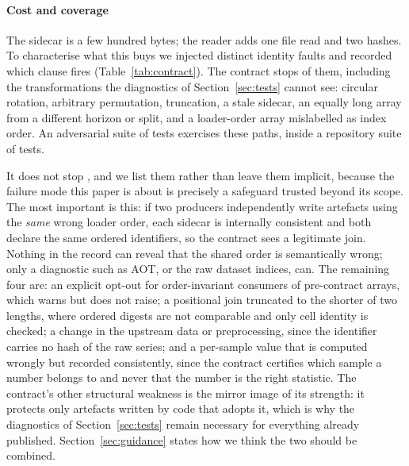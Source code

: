 \documentclass[a4paper,fleqn]{cas-sc}
\newcommand{\fitwidth}[1]{%
  \resizebox{\ifdim\width>\linewidth \linewidth\else \width\fi}{!}{#1}}
\begin{document}
\paragraph{Cost and coverage}
The sidecar is a few hundred bytes; the reader adds one file read and two hashes.
To characterise what this buys we injected \NumContractFaults{} distinct identity
faults and recorded which clause fires
(Table~\ref{tab:contract}). The contract stops \NumContractDetected{} of them,
including the transformations the diagnostics of Section~\ref{sec:tests} cannot
see: circular rotation, arbitrary permutation, truncation, a stale sidecar, an
equally long array from a different horizon or split, and a loader-order array
mislabelled as index order. An adversarial suite of
\NumContractAdversarialTests{} tests exercises these paths, inside a repository
suite of \NumContractRepoTests{} tests.

It does not stop \NumContractUndetected{}, and we list them rather than leave them
implicit, because the failure mode this paper is about is precisely a safeguard
trusted beyond its scope. The most important is this: if two producers
independently write artefacts using the \emph{same} wrong loader order, each
sidecar is internally consistent and both declare the same ordered identifiers, so
the contract sees a legitimate join. Nothing in the record can reveal that the
shared order is semantically wrong; only a diagnostic such as AOT, or the raw
dataset indices, can. The remaining four are: an explicit opt-out for
order-invariant consumers of pre-contract arrays, which warns but does not raise;
a positional join truncated to the shorter of two lengths, where ordered digests
are not comparable and only cell identity is checked; a change in the upstream data
or preprocessing, since the identifier carries no hash of the raw series; and a
per-sample value that is computed wrongly but recorded consistently, since the
contract certifies which sample a number belongs to and never that the number is
the right statistic. The contract's other structural weakness is the mirror image
of its strength: it
protects only artefacts written by code that adopts it, which is why the
diagnostics of
Section~\ref{sec:tests} remain necessary for everything already published.
Section~\ref{sec:guidance} states how we think the two should be combined.

\begin{table}[t]
\centering
\caption{Machine-generated coverage of the provenance contract over
\NumContractFaults{} injected identity faults: \NumContractDetected{} are stopped
by a named clause, \NumContractUndetected{} are not. The uncovered rows are
reported in full because a contract trusted beyond its scope reproduces the
failure mode this paper is about. Generated by
\texttt{tools/make\_contract\_coverage.py}; source
\texttt{artifacts/contract\_coverage.csv}.}
\label{tab:contract}
\fitwidth{}
\end{table}
\end{document}
